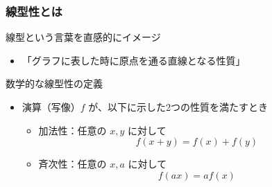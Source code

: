 \documentclass[unicode,12pt,aspectratio=169]{beamer}
\begin{document}
\begin{frame}
	\frametitle{線型性とは}
	\begin{block}{線型という言葉を直感的にイメージ}
		\begin{itemize}
			\item \alert{「グラフに表した時に原点を通る直線となる性質」}
		\end{itemize}
	\end{block}
	
	\begin{block}{数学的な線型性の定義}
			\begin{itemize}
				\item 演算（写像）$f$ が、以下に示した2つの性質を満たすとき
				\begin{itemize}
					\item 加法性：任意の $x,y$ に対して
					\begin{equation*}
						f(x+y)=f(x)+f(y)
					\end{equation*}
					\item 斉次性：任意の $x,a$ に対して
					\begin{equation*}
						f(ax)=af(x)
					\end{equation*}
				\end{itemize}
			\end{itemize}
	\end{block}
\end{frame}
\end{document}
